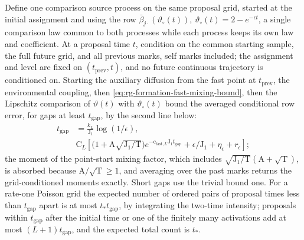 Define one comparison source process on the same proposal grid, started at
the initial assignment and using the row \(\bar\beta_{j\cdot}(\vartheta_\circ(t))\),
\(\vartheta_\circ(t)=2-e^{-\epsilon t}\), a single comparison law common to both
processes while each process keeps its own law and coefficient. At a proposal
time \(t\), condition on the common starting sample, the full future grid, and
all previous marks, self marks included; the assignment and level are fixed
on \((t_{\mathrm{prev}},t)\), and no future continuous trajectory is conditioned
on. Starting the auxiliary diffusion from the fast point at
\(t_{\mathrm{prev}}\), the environmental coupling, then
\cref{eq:rg-formation-fast-mixing-bound}, then the Lipschitz comparison of
\(\vartheta(t)\) with \(\vartheta_\circ(t)\) bound the averaged conditional row
error, for gaps at least \(t_{\mathrm{gap}}\), by the second line below:
\begin{align}
 t_{\mathrm{gap}}&=\frac{k_L}{\mathrm J_1}\log(1/\epsilon),
 \label{eq:rg-formation-history-gap}\\
 &\mathrm C_L\left[
 \bigl(1+\mathrm A\sqrt{\mathrm J_1/\mathrm T}\bigr)e^{-\mathrm c_{\mathrm{fast},L}\mathrm J_1t_{\mathrm{gap}}}
       +\epsilon/\mathrm J_1+\eta_\epsilon+r_\epsilon\right];
 \label{eq:rg-formation-long-gap-row-error}
\end{align}
the moment of the point-start mixing factor, which includes
\(\sqrt{\mathrm J_1/\mathrm T}(\mathrm A+\sqrt{\mathrm T})\), is absorbed because
\(\mathrm A/\sqrt{\mathrm T}\ge1\), and averaging over the past marks returns
the grid-conditioned moments exactly. Short gaps use the trivial bound one.
For a rate-one Poisson grid the expected number of ordered pairs of proposal
times less than \(t_{\mathrm{gap}}\) apart is at most \(t_*t_{\mathrm{gap}}\),
by integrating the two-time intensity; proposals within \(t_{\mathrm{gap}}\)
after the initial time or one of the finitely many activations add at most
\((L+1)t_{\mathrm{gap}}\), and the expected total count is \(t_*\).

